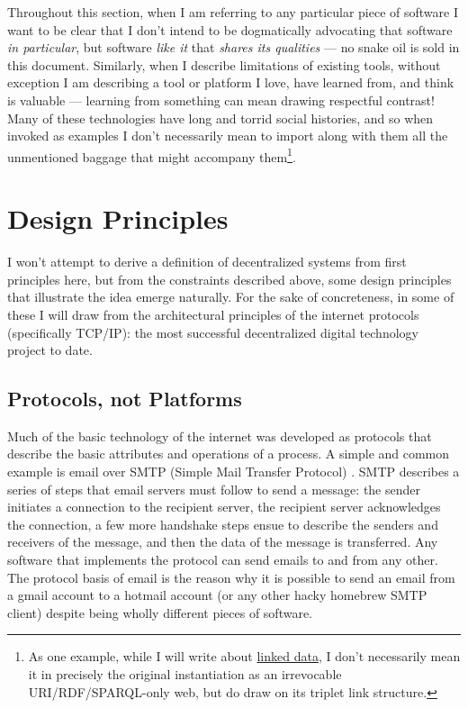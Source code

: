 Throughout this section, when I am referring to any particular piece of
software I want to be clear that I don't intend to be dogmatically
advocating that software \emph{in particular}, but software \emph{like
it} that \emph{shares its qualities} --- no snake oil is sold in this
document. Similarly, when I describe limitations of existing tools,
without exception I am describing a tool or platform I love, have
learned from, and think is valuable --- learning from something can mean
drawing respectful contrast! Many of these technologies have long and
torrid social histories, and so when invoked as examples I don't
necessarily mean to import along with them all the unmentioned baggage
that might accompany them\footnote{As one example, while I will write
  about \href{https://www.w3.org/DesignIssues/LinkedData.html}{linked
  data}, I don't necessarily mean it in precisely the original
  instantiation as an irrevocable URI/RDF/SPARQL-only web, but do draw
  on its triplet link structure.}.

\hypertarget{design-principles}{%
\section{Design Principles}\label{design-principles}}

I won't attempt to derive a definition of decentralized systems from
first principles here, but from the constraints described above, some
design principles that illustrate the idea emerge naturally. For the
sake of concreteness, in some of these I will draw from the
architectural principles of the internet protocols (specifically
TCP/IP): the most successful decentralized digital technology project to
date.

\hypertarget{protocols-not-platforms}{%
\subsection{Protocols, not Platforms}\label{protocols-not-platforms}}

Much of the basic technology of the internet was developed as protocols
that describe the basic attributes and operations of a process. A simple
and common example is email over SMTP (Simple Mail Transfer Protocol)
\citep{Rfc5321SimpleMail} . SMTP describes a series of steps that
email servers must follow to send a message: the sender initiates a
connection to the recipient server, the recipient server acknowledges
the connection, a few more handshake steps ensue to describe the senders
and receivers of the message, and then the data of the message is
transferred. Any software that implements the protocol can send emails
to and from any other. The protocol basis of email is the reason why it
is possible to send an email from a gmail account to a hotmail account
(or any other hacky homebrew SMTP client) despite being wholly different
pieces of software.

